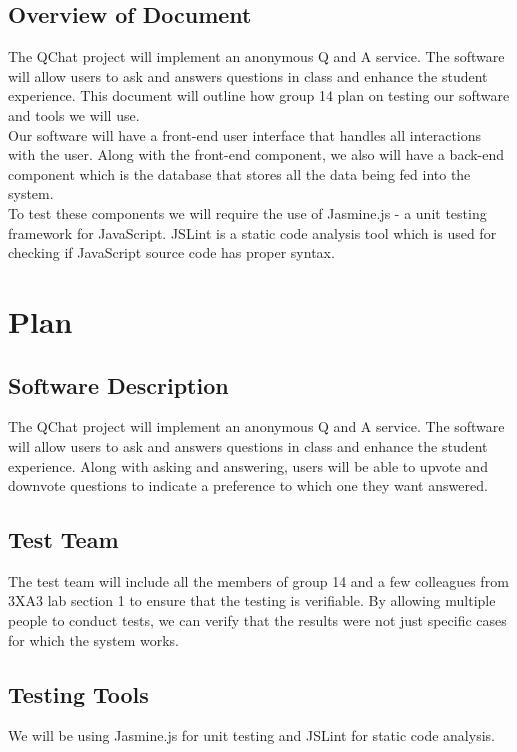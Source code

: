 \documentclass[12pt, titlepage]{article}
\begin{document}
\subsection{Overview of Document}

The QChat project will implement an anonymous Q and A service. The software will allow users to ask and answers questions in class and enhance the student experience. This document will outline how group 14 plan on testing our software and tools we will use. \\

Our software will have a front-end user interface that handles all interactions with the user. Along with the front-end component, we also will have a back-end component which is the database that stores all the data being fed into the system. \\

To test these components we will require the use of Jasmine.js - a unit testing framework for JavaScript. JSLint is a static code analysis tool which is used for checking if JavaScript source code has proper syntax. \\

\section{Plan}
	
\subsection{Software Description}
The QChat project will implement an anonymous Q and A service. The software will allow users to ask and answers questions in class and enhance the student experience. Along with asking and answering, users will be able to upvote and downvote questions to indicate a preference to which one they want answered. 

\subsection{Test Team}
The test team will include all the members of group 14 and a few colleagues from 3XA3 lab section 1 to ensure that the testing is verifiable. By allowing multiple people to conduct tests, we can verify that the results were not just specific cases for which the system works.

\subsection{Testing Tools}
We will be using Jasmine.js for unit testing and JSLint for static code analysis.
\end{document}
